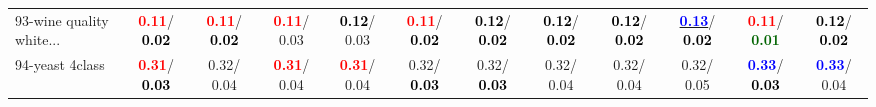 \begin{table}[h]
\begin{center}
{\begin{tabular}{lc|c|c|c|c|c|c|c|c|c|c}
93-wine quality white... & \textcolor{red}{\textbf{  0.11}}/\textcolor{black}{\textbf{  0.02}} & \textcolor{red}{\textbf{  0.11}}/\textcolor{black}{\textbf{  0.02}} & \textcolor{red}{\textbf{  0.11}}/  0.03 & \textcolor{black}{\textbf{  0.12}}/  0.03 & \textcolor{red}{\textbf{  0.11}}/\textcolor{black}{\textbf{  0.02}} & \textcolor{black}{\textbf{  0.12}}/\textcolor{black}{\textbf{  0.02}} & \textcolor{black}{\textbf{  0.12}}/\textcolor{black}{\textbf{  0.02}} & \textcolor{black}{\textbf{  0.12}}/\textcolor{black}{\textbf{  0.02}} & \underline{\textcolor{blue}{\textbf{  0.13}}}/\textcolor{black}{\textbf{  0.02}} & \textcolor{red}{\textbf{  0.11}}/\textcolor{darkgreen}{\textbf{  0.01}} & \textcolor{black}{\textbf{  0.12}}/\textcolor{black}{\textbf{  0.02}} \\
94-yeast 4class & \textcolor{red}{\textbf{  0.31}}/\textcolor{black}{\textbf{  0.03}} &   0.32/  0.04 & \textcolor{red}{\textbf{  0.31}}/  0.04 & \textcolor{red}{\textbf{  0.31}}/  0.04 &   0.32/\textcolor{black}{\textbf{  0.03}} &   0.32/\textcolor{black}{\textbf{  0.03}} &   0.32/  0.04 &   0.32/  0.04 &   0.32/  0.05 & \textcolor{blue}{\textbf{  0.33}}/\textcolor{black}{\textbf{  0.03}} & \textcolor{blue}{\textbf{  0.33}}/  0.04 \\\end{tabular}}\label{stratsALCKappa2aC4.5Redux}
\end{center}
\end{table}